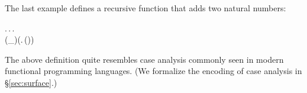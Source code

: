 The last example defines a recursive function that adds two natural
numbers:
\begin{hscode}\SaveRestoreHook
{}%
%
%
%
\>[3]{}\mu\;\mathbin{:}\to {}\to {}.\,\lambda {}\mathbin{:}.\,\lambda {}\mathbin{:}.\,{}\<[E]%
\\
\>[3]{}\<[7]%
\>[7]{}(_\downarrow\;)\;\;\;(\lambda {}\mathbin{:}.\,\;(\;\;)){}\<[E]%
\ColumnHook
\end{hscode}\resethooks
The above definition quite resembles case analysis commonly seen in
modern functional programming languages. (We formalize the encoding of
case analysis in \S\ref{sec:surface}.)



